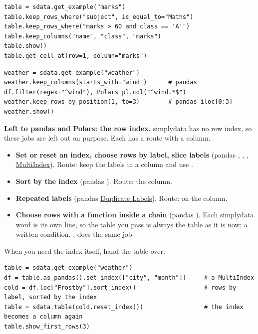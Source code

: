 \begin{lstlisting}[style=py]
table = sdata.get_example("marks")
table.keep_rows_where("subject", is_equal_to="Maths")
table.keep_rows_where("marks > 60 and class == 'A'")
table.keep_columns("name", "class", "marks")
table.show()
table.get_cell_at(row=1, column="marks")
\end{lstlisting}

\begin{lstlisting}[style=py]
weather = sdata.get_example("weather")
weather.keep_columns(starts_with="wind")      # pandas df.filter(regex="^wind"), Polars pl.col("^wind.*$")
weather.keep_rows_by_position(1, to=3)        # pandas iloc[0:3]
weather.show()
\end{lstlisting}

\textbf{Left to pandas and Polars: the row index.} simplydata has no row index, so these jobs are left
out on purpose. Each has a route with a column.
\begin{itemize}
  \item \textbf{Set or reset an index, choose rows by label, slice labels} (pandas ,
    , ,
    \href{https://pandas.pydata.org/docs/user_guide/advanced.html}{MultiIndex}).
    Route: keep the labels in a column and use .
  \item \textbf{Sort by the index} (pandas ). Route:  the column.
  \item \textbf{Repeated labels} (pandas \href{https://pandas.pydata.org/docs/user_guide/duplicates.html}{Duplicate
    Labels}). Route:  on the column.
  \item \textbf{Choose rows with a function inside a chain} (pandas ). Each
    simplydata word is its own line, so the table you pass is always the table as it is now; a written
    condition, , does the same job.
\end{itemize}
When you need the index itself, hand the table over:

\begin{lstlisting}[style=py]
table = sdata.get_example("weather")
df = table.as_pandas().set_index(["city", "month"])     # a MultiIndex
cold = df.loc["Frostby"].sort_index()                   # rows by label, sorted by the index
table = sdata.table(cold.reset_index())                 # the index becomes a column again
table.show_first_rows(3)
\end{lstlisting}

